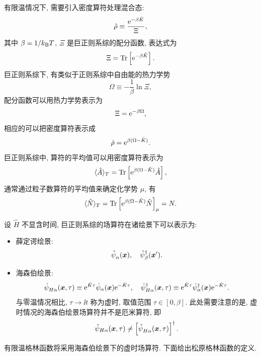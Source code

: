 有限温情况下, 需要引入密度算符处理混合态: 
\begin{equation}
    \hat{\rho}\equiv \frac{\mathrm{e}^{-\beta\hat{K}}}{\Xi },
\end{equation}
其中 $\beta=1/k_{\mathrm{B}}T$, $\Xi$ 是巨正则系综的配分函数, 表达式为 
\begin{equation}
    \Xi=\mathrm{Tr}\left[ \mathrm{e}^{-\beta \hat{K}} \right].
\end{equation}
巨正则系综下, 有类似于正则系综中自由能的热力学势 
\begin{equation}
    \Omega\equiv -\frac{1}{\beta}\ln \Xi,
\end{equation}
配分函数可以用热力学势表示为 
\begin{equation}
    \Xi =\mathrm{e}^{-\beta\Omega},
\end{equation}
相应的可以把密度算符表示成 
\begin{equation}
    \hat{\rho}=\mathrm{e}^{\beta (\Omega-\hat{K})}.
\end{equation}
巨正则系综中, 算符的平均值可以用密度算符表示为 
\begin{equation}
    \langle \hat{A} \rangle_T=\mathrm{Tr}\left[ \mathrm{e}^{\beta(\Omega-\hat{K})}\hat{A} \right],
\end{equation}
通常通过粒子数算符的平均值来确定化学势 $\mu$, 有 
\begin{equation}
    \langle \hat{N} \rangle_T=\mathrm{Tr}\left[ \mathrm{e}^{\beta(\Omega-\hat{K}) }\hat{N} \right]_\mu=N.
\end{equation}

设 $\hat{H}$ 不显含时间, 巨正则系综的场算符在诸绘景下可以表示为:
\begin{itemize}
    \item 薛定谔绘景: 
    \begin{equation}
        \hat{\psi}^{}_{\alpha}(\boldsymbol{x}),\quad \hat{\psi}_\beta^\dagger (\boldsymbol{x}'). 
    \end{equation}
    \item 海森伯绘景: 
    \begin{equation}
        \hat{\psi}_{H\alpha}^{ }(\boldsymbol{x},\tau)\equiv \mathrm{e}^{\hat{K}\tau}\hat{\psi}_\alpha(\boldsymbol{x})\mathrm{e}^{-\hat{K}\tau},\quad \hat{\psi}^\dagger_{H\alpha}(\boldsymbol{x},\tau)\equiv \mathrm{e}^{\hat{K}\tau}\hat{\psi}_\alpha^\dagger (\boldsymbol{x})\mathrm{e}^{-\hat{K}\tau}.
    \end{equation}
    与零温情况相比, $\tau\to \ii t$ 称为虚时, 取值范围 $\tau \in [0,\beta]$. 此处需要注意的是, 虚时情况的海森伯绘景场算符并不是厄米算符, 即 
    \begin{equation}
        \hat{\psi}_{H\alpha} (\boldsymbol{x},\tau)\ne \left[ \hat{\psi}^{}_{H\alpha}(\boldsymbol{x},\tau) \right]^\dagger.
    \end{equation}
\end{itemize}
有限温格林函数将采用海森伯绘景下的虚时场算符. 下面给出松原格林函数的定义.

